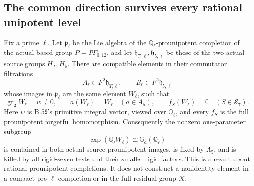 \subsection*{The common direction survives every rational unipotent level}

Fix a prime $\ell$.  Let $\mathfrak p_\ell$ be the Lie
algebra of the $\mathbb Q_\ell$-prounipotent completion
of the actual based group $P=P\Gamma_{0,12}$, and let
$\mathfrak h_{T,\ell},\mathfrak h_{5,\ell}$ be those
of the two actual source groups $H_T,H_5$.
There are compatible elements in their commutator
filtrations
\[
 A_\ell\in F^2\mathfrak h_{T,\ell},\qquad
 B_\ell\in F^2\mathfrak h_{5,\ell}
\]
whose images in $\mathfrak p_\ell$ are the same element
$W_\ell$, such that
\[
 \operatorname{gr}_2W_\ell=w\ne0,\qquad
 a(W_\ell)=W_\ell\quad(a\in A_5),\qquad
 f_S(W_\ell)=0\quad(S\in\mathscr S_7).
                                                               \tag{B.66.1}
\]
Here $w$ is B.59's primitive integral vector, viewed over
$\mathbb Q_\ell$, and every $f_S$ is the full
prounipotent forgetful homomorphism.
Consequently the nonzero one-parameter subgroup
\[
                \exp(\mathbb Q_\ell W_\ell)
                   \cong\mathbb G_a(\mathbb Q_\ell)
                                                               \tag{B.66.2}
\]
is contained in both actual source prounipotent images,
is fixed by $A_5$, and is killed by all rigid-seven tests
and their smaller rigid factors.
This is a result about rational prounipotent completions.
It does not construct a nonidentity element in a compact
pro-$\ell$ completion or in the full residual group
$\mathcal K$.

